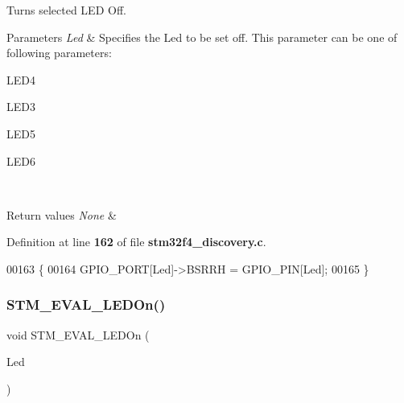 Turns selected L\+ED Off. 


\begin{DoxyParams}{Parameters}
{\em Led} & Specifies the Led to be set off. This parameter can be one of following parameters\+: \begin{DoxyItemize}
\item L\+E\+D4 \item L\+E\+D3 \item L\+E\+D5 \item L\+E\+D6 \end{DoxyItemize}
\\
\hline
\end{DoxyParams}

\begin{DoxyRetVals}{Return values}
{\em None} & \\
\hline
\end{DoxyRetVals}


Definition at line \textbf{ 162} of file \textbf{ stm32f4\+\_\+discovery.\+c}.


\begin{DoxyCode}
00163 \{
00164   GPIO_PORT[Led]->BSRRH = GPIO_PIN[Led];  
00165 \}
\end{DoxyCode}
\mbox{\label{group__STM32F4__DISCOVERY__LOW__LEVEL__Private__Functions_gad27fa430d867e6dde94cb7896fcc42fc}} 
\subsubsection{S\+T\+M\+\_\+\+E\+V\+A\+L\+\_\+\+L\+E\+D\+On()}
{\footnotesize\ttfamily void S\+T\+M\+\_\+\+E\+V\+A\+L\+\_\+\+L\+E\+D\+On (\begin{DoxyParamCaption}\item[{\textbf{ Led\+\_\+\+Type\+Def}}]{Led }\end{DoxyParamCaption})}



